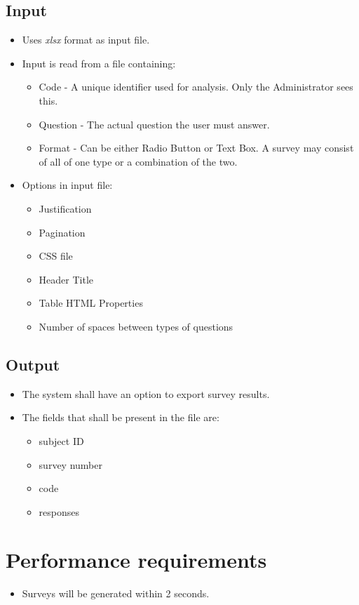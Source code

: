 \documentclass[a4paper,12pt,oneside]{report}
\begin{document}
\subsection{ Input}
\begin{itemize} 
	\item Uses {\it xlsx} format as input file.
	\item  Input is read from a file containing:
	\begin{itemize}
        	\item Code - A unique identifier used for analysis. Only the Administrator sees this.
         	\item Question - The actual question the user must answer.
          	\item Format - Can be either Radio Button or Text Box. A survey may consist of all of one type or a combination of the two.
	\end{itemize}
   	\item Options in input file:
	\begin{itemize}
        	\item  Justification
         	\item Pagination
         	\item CSS file
         	\item Header Title
         	\item Table HTML Properties
         	\item Number of spaces between types of questions
	\end{itemize}
\end{itemize}

\subsection{Output}
\begin{itemize}
        \item The system shall have an option to export survey results. 
	\item The fields that shall be present in the file are:
	\begin{itemize}
		\item subject ID 
		\item survey number 
		\item code 
		\item responses
	\end{itemize}
\end{itemize}

\section{Performance requirements}
\begin{itemize}
	\item Surveys will be generated within 2 seconds.
\end{itemize}
\end{document}
